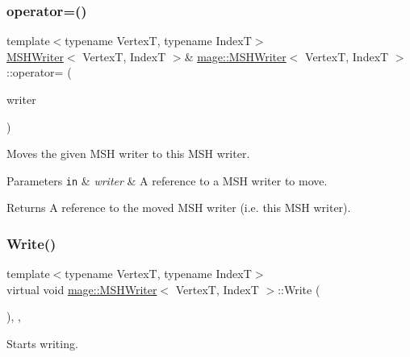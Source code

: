 \subsubsection{\texorpdfstring{operator=()}{operator=()}\hspace{0.1cm}{\footnotesize\ttfamily [2/2]}}
{\footnotesize\ttfamily template$<$typename VertexT, typename IndexT$>$ \\
\hyperlink{classmage_1_1_m_s_h_writer}{M\+S\+H\+Writer}$<$ VertexT, IndexT $>$\& \hyperlink{classmage_1_1_m_s_h_writer}{mage\+::\+M\+S\+H\+Writer}$<$ VertexT, IndexT $>$\+::operator= (\begin{DoxyParamCaption}\item[{\hyperlink{classmage_1_1_m_s_h_writer}{M\+S\+H\+Writer}$<$ VertexT, IndexT $>$ \&\&}]{writer }\end{DoxyParamCaption})\hspace{0.3cm}{\ttfamily [delete]}}

Moves the given M\+SH writer to this M\+SH writer.


\begin{DoxyParams}[1]{Parameters}
\mbox{\tt in}  & {\em writer} & A reference to a M\+SH writer to move. \\
\hline
\end{DoxyParams}
\begin{DoxyReturn}{Returns}
A reference to the moved M\+SH writer (i.\+e. this M\+SH writer). 
\end{DoxyReturn}
\hypertarget{classmage_1_1_m_s_h_writer_ab97c9570c45bff97d88700d0dcf3ed75}{}\label{classmage_1_1_m_s_h_writer_ab97c9570c45bff97d88700d0dcf3ed75} 
\subsubsection{\texorpdfstring{Write()}{Write()}}
{\footnotesize\ttfamily template$<$typename VertexT, typename IndexT$>$ \\
virtual void \hyperlink{classmage_1_1_m_s_h_writer}{mage\+::\+M\+S\+H\+Writer}$<$ VertexT, IndexT $>$\+::Write (\begin{DoxyParamCaption}{ }\end{DoxyParamCaption})\hspace{0.3cm}{\ttfamily [override]}, {\ttfamily [private]}, {\ttfamily [virtual]}}

Starts writing.


